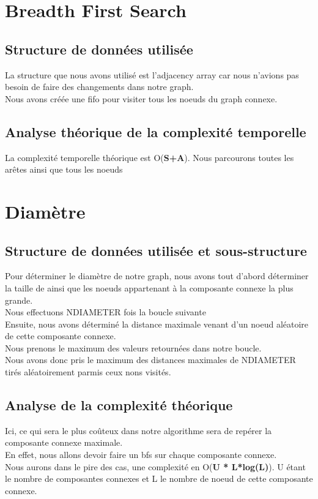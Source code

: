 \documentclass[a4paper,10pt]{report}
\begin{document}
\section{Breadth First Search}
\subsection{Structure de données utilisée}
La structure que nous avons utilisé est l'adjacency array car nous n'avions pas besoin de faire des changements dans notre graph.
\\
Nous avons créée une fifo pour visiter tous les noeuds du graph connexe. 
\subsection{Analyse théorique de la complexité temporelle}
La complexité temporelle théorique est O(\textbf{S+A}). Nous parcourons toutes les arêtes ainsi que tous les noeuds

\section{Diamètre}
\subsection{Structure de données utilisée et sous-structure}
Pour déterminer le diamètre de notre graph, nous avons tout d'abord déterminer la taille de ainsi que les noeuds appartenant à la composante connexe la plus grande.
\\
Nous effectuons NDIAMETER fois la boucle suivante 
\\
Ensuite, nous avons déterminé la distance maximale venant d'un noeud aléatoire de cette composante connexe.
\\
Nous prenons le maximum des valeurs retournées dans notre boucle.
\\
Nous avons donc pris le maximum des distances maximales de NDIAMETER tirés aléatoirement parmis ceux nons visités.
\\
\subsection{Analyse de la complexité théorique}
Ici, ce qui sera le plus coûteux dans notre algorithme sera de repérer la composante connexe maximale. 
\\
\newline
En effet, nous allons devoir faire un bfs sur chaque composante connexe.
\\
Nous aurons dans le pire des cas, une complexité en O(\textbf{U * L*log(L)}).
\newline
U étant le nombre de composantes connexes et L le nombre de noeud de cette composante connexe.
\end{document}
